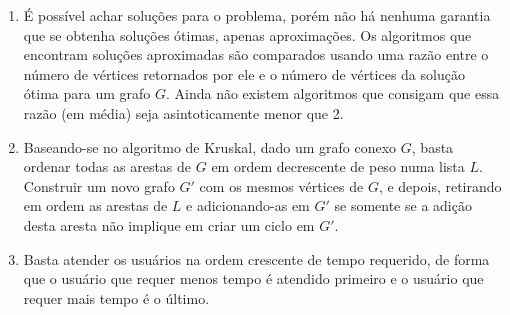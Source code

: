 \documentclass{article}
\begin{document}
\begin{enumerate}

	\item É possível achar soluções para o problema, porém não há nenhuma
	garantia que se obtenha soluções ótimas, apenas aproximações. Os algoritmos
	que encontram soluções aproximadas são comparados usando uma razão entre o
	número de vértices retornados por ele e o número de vértices da solução
	ótima para um grafo $G$. Ainda não existem algoritmos que consigam que essa
	razão (em média) seja asintoticamente menor que 2.

	\item Baseando-se no algoritmo de Kruskal, dado um grafo conexo $G$, basta
	ordenar todas as arestas de $G$ em ordem decrescente de peso numa lista
	$L$. Construir um novo grafo $G'$ com os mesmos vértices de $G$, e depois,
	retirando em ordem as arestas de $L$ e adicionando-as em $G'$ se somente se
	a adição desta aresta não implique em criar um ciclo em $G'$.

	\item Basta atender os usuários na ordem crescente de tempo requerido, de
	forma que o usuário que requer menos tempo é atendido primeiro e o usuário
	que requer mais tempo é o último.

\end{enumerate}
\end{document}
